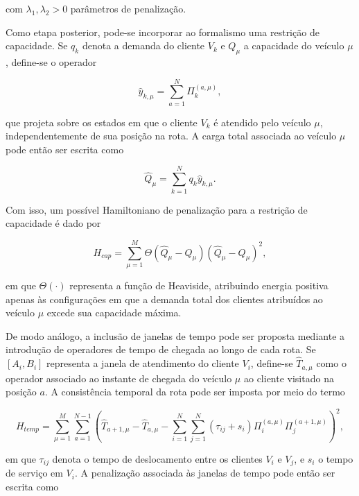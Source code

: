 \noindent com $\lambda_1, \lambda_2 > 0$ parâmetros de penalização.

Como etapa posterior, pode-se incorporar ao formalismo uma restrição de capacidade. Se $q_k$ denota a demanda do cliente $V_k$ e $Q_\mu$ a capacidade do veículo $\mu$, define-se o operador

\begin{equation}
\hat{y}_{k,\mu} = \sum_{a=1}^{N} \Pi^{(a,\mu)}_k,
\end{equation}

\noindent que projeta sobre os estados em que o cliente $V_k$ é atendido pelo veículo $\mu$, independentemente de sua posição na rota. A carga total associada ao veículo $\mu$ pode então ser escrita como

\begin{equation}
\hat{Q}_\mu = \sum_{k=1}^{N} q_k \hat{y}_{k,\mu}.
\end{equation}

Com isso, um possível Hamiltoniano de penalização para a restrição de capacidade é dado por

\begin{equation}
H_{cap} = \sum_{\mu=1}^{M} \Theta\left(\hat{Q}_\mu - Q_\mu\right) 
\left(\hat{Q}_\mu - Q_\mu\right)^2,
\end{equation}

\noindent em que $\Theta(\cdot)$ representa a função de Heaviside, atribuindo energia positiva apenas às configurações em que a demanda total dos clientes atribuídos ao veículo $\mu$ excede sua capacidade máxima.

De modo análogo, a inclusão de janelas de tempo pode ser proposta mediante a introdução de operadores de tempo de chegada ao longo de cada rota. Se $[A_i, B_i]$ representa a janela de atendimento do cliente $V_i$, define-se $\hat{T}_{a,\mu}$ como o operador associado ao instante de chegada do veículo $\mu$ ao cliente visitado na posição $a$. A consistência temporal da rota pode ser imposta por meio do termo

\begin{equation}
H_{temp} = \sum_{\mu=1}^{M} \sum_{a=1}^{N-1} \left(\hat{T}_{a+1,\mu} 
- \hat{T}_{a,\mu} - \sum_{i=1}^{N}\sum_{j=1}^{N}(\tau_{ij} + s_i) 
\Pi^{(a,\mu)}_i \Pi^{(a+1,\mu)}_j\right)^2,
\end{equation}

\noindent em que $\tau_{ij}$ denota o tempo de deslocamento entre os clientes $V_i$ e $V_j$, e $s_i$ o tempo de serviço em $V_i$. A penalização associada às janelas de tempo pode então ser escrita como

